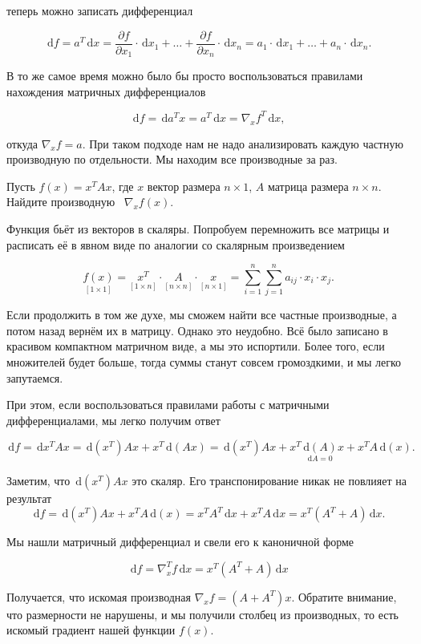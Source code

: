 \documentclass[12pt,fleqn]{article}
\newcommand{\dx}[1]{\,\mathrm{d}#1} %
\begin{document}
\begin{esSolution}
теперь можно записать дифференциал

\[
\dx{f} = a^T \dx{x} = \frac{\partial f}{\partial x_1} \cdot \dx{x_1} + \ldots +\frac{\partial f}{\partial x_n} \cdot \dx{x_n} = a_1 \cdot \dx{x_1} + \ldots + a_n \cdot \dx{x_n}.
\]

В то же самое время можно было бы просто воспользоваться правилами нахождения матричных дифференциалов

\[
\dx{f} =  \dx{a^T x} = a^T \dx{x} = \nabla_x f^T \dx{x},
\]

откуда $ \nabla_x f = a$. При таком подходе нам не надо анализировать каждую частную производную по отдельности. Мы находим все производные за раз. 
\end{esSolution}

\newpage
\begin{vkProblem} Пусть $f(x) = x^T A x$, где $x$ вектор размера $n \times 1$, $A$ матрица размера $n \times n$. Найдите производную ~$\nabla_x f(x)$.
\end{vkProblem}

\begin{esSolution}
Функция бьёт из векторов в скаляры. Попробуем перемножить все матрицы и расписать её в явном виде по аналогии со скалярным произведением 

\begin{equation*}
    \underset{[1 \times 1]}{f(x)} = \underset{[1 \times n]}{x^T} \cdot \underset{[n \times n]}{A} \cdot \underset{[n \times 1]}{x} = \sum_{i = 1}^n \sum_{j=1}^n a_{ij} \cdot x_i \cdot x_j.
\end{equation*} 

Если продолжить в том же духе, мы сможем найти все частные производные, а потом назад вернём их в матрицу. Однако это неудобно. Всё было записано в красивом компактном матричном виде, а мы это испортили. Более того, если множителей будет больше, тогда суммы станут совсем громоздкими, и мы легко запутаемся. 

При этом, если воспользоваться правилами работы с матричными дифференциалами, мы легко получим ответ

\[
\dx{f} =  \dx{x^T A x} =  \dx{(x^T)} A x + x^T \dx{(Ax)} =  \dx{(x^T)} A x + x^T \underset{\dx{A} = 0}{\dx{(A)}} x + x^T A \dx{(x)}.
\]

Заметим, что $\dx{(x^T)} A x$ это скаляр. Его транспонирование никак не повлияет на результат
\[
\dx{f} = \dx{(x^T)} A x + x^T A \dx{(x)} = x^T A^T \dx{x}  + x^T A \dx{x} = x^T(A^T + A) \dx{x}.
\]

Мы нашли матричный дифференциал и свели его к каноничной форме 

\[
\dx{f} = \nabla^T_x f \dx{x} = x^T(A^T + A) \dx{x}
\]

Получается, что искомая производная $\nabla_x f = (A + A^T) x$. Обратите внимание, что размерности не нарушены, и мы получили столбец из производных, то есть искомый градиент нашей функции $f(x)$. \end{esSolution}
\end{document}
